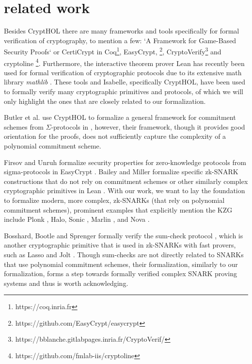 \section{related work}
Besides CryptHOL there are many frameworks and tools specifically for formal verification of cryptography, to mention a few: `A Framework for Game-Based Security Proofs` \parencite{game_based_coq} or CertiCrypt \parencite{crypto_coq} in Coq\footnote{https://coq.inria.fr}, EasyCrypt, \footnote{https://github.com/EasyCrypt/easycrypt}, CryptoVerify\footnote{https://bblanche.gitlabpages.inria.fr/CryptoVerif/} and cryptoline \footnote{https://github.com/fmlab-iis/cryptoline}. Furthermore, the interactive theorem prover Lean \parencite{Lean} has recently been used for formal verification of cryptographic protocols due to its extensive math library \textit{mathlib} \parencite{Lean_groth16}.
These tools and Isabelle, specifically CryptHOL, have been used to formally verify many cryptographic primitives and protocols, of which we will only highlight the ones that are closely related to our formalization.

Butler et al. use CryptHOL to formalize a general framework for commitment schemes from $\Sigma$-protocols in \parencite{sigma_commit_crypto}, however, their framework, though it provides good orientation for the proofs, does not sufficiently capture the complexity of a polynomial commitment scheme.

Firsov and Unruh formalize security properties for zero-knowledge protocols from sigma-protocols in EasyCrypt \parencite{zk_easycrypt}.
Bailey and Miller formalize specific zk-SNARK constructions that do not rely on commitment schemes or other similarly complex cryptographic primitives in Lean \parencite{Lean_groth16}. With our work, we want to lay the foundation to formalize modern, more complex, zk-SNARKs (that rely on polynomial commitment schemes), prominent examples that explicitly mention the KZG include Plonk \parencite{plonk}, Halo\parencite{halo}, Sonic \parencite{sonic}, Marlin \parencite{marlin}, and Nova \parencite{nova}.

Bosshard, Bootle and Sprenger formally verify the sum-check protocol \parencite{sumcheck_Isabelle}, which is another cryptographic primitive that is used in zk-SNARKs with fast provers, such as Lasso and Jolt \parencite{Lasso, jolt}. Though sum-checks are not directly related to SNARKs that use polynomial commitment schemes, their formalization, similarly to our formalization, forms a step towards formally verified complex SNARK proving systems and thus is worth acknowledging.